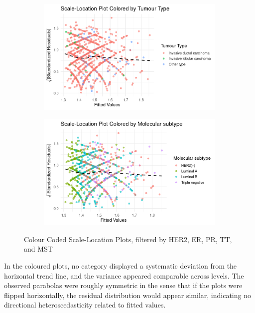 \documentclass[letter]{article}
\begin{document}
\begin{figure}[htbp]
\vspace{0.5cm}

\begin{subfigure}[b]{0.48\textwidth}
    \includegraphics[width=\textwidth]{Color4.png}
\end{subfigure}
\hfill
\begin{subfigure}[b]{0.48\textwidth}
    \includegraphics[width=\textwidth]{Color5.png}
\end{subfigure}

\caption{Colour Coded Scale-Location Plots, filtered by HER2, ER, PR, TT, and MST}
\label{fig:combined_plots}
\end{figure}

In the coloured plots, no category displayed a systematic deviation from the horizontal trend line, and the variance appeared comparable across levels. The observed parabolas were roughly symmetric in the sense 
that if the plots were flipped horizontally, the residual distribution would appear similar, indicating no directional heteroscedasticity related to fitted values.
\end{document}
